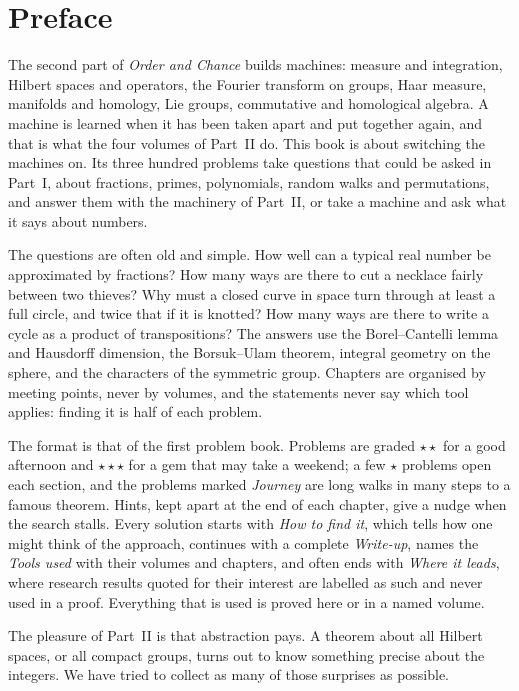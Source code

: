 \chapter*{Preface}
The second part of \emph{Order and Chance} builds machines: measure and integration, Hilbert spaces and operators, the
Fourier transform on groups, Haar measure, manifolds and homology, Lie groups, commutative and homological algebra. A machine
is learned when it has been taken apart and put together again, and that is what the four volumes of Part~II do. This book is
about switching the machines on. Its three hundred problems take questions that could be asked in Part~I, about fractions,
primes, polynomials, random walks and permutations, and answer them with the machinery of Part~II, or take a machine and ask
what it says about numbers.

The questions are often old and simple. How well can a typical real number be approximated by fractions? How many ways are
there to cut a necklace fairly between two thieves? Why must a closed curve in space turn through at least a full circle,
and twice that if it is knotted? How many ways are there to write a cycle as a product of transpositions? The answers use
the Borel--Cantelli lemma and Hausdorff dimension, the Borsuk--Ulam theorem, integral geometry on the sphere, and the
characters of the symmetric group. Chapters are organised by meeting points, never by volumes, and the statements never say
which tool applies: finding it is half of each problem.

The format is that of the first problem book. Problems are graded \textbf{$\star\star$} for a good afternoon and
\textbf{$\star\star\star$} for a gem that may take a weekend; a few \textbf{$\star$} problems open each section, and the
problems marked \emph{Journey} are long walks in many steps to a famous theorem. Hints, kept apart at the end of each chapter,
give a nudge when the search stalls. Every solution starts with \emph{How to find it}, which tells how one might think of the
approach, continues with a complete \emph{Write-up}, names the \emph{Tools used} with their volumes and chapters, and often
ends with \emph{Where it leads}, where research results quoted for their interest are labelled as such and never used in a
proof. Everything that is used is proved here or in a named volume.


The pleasure of Part~II is that abstraction pays. A theorem about all Hilbert spaces, or all compact groups, turns out to know
something precise about the integers. We have tried to collect as many of those surprises as possible.
